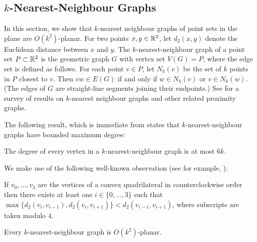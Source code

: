 \documentclass{patmorin}
\begin{document}
\subsection{$k$-Nearest-Neighbour Graphs}

In this section, we show that $k$-nearest neighbour graphs of point sets in the plane are $O(k^2)$-planar.  For two points $x,y\in\mathbb{R}^2$, let $d_2(x,y)$ denote the Euclidean distance between $x$ and $y$. The $k$-nearest-neighbour graph of a point set $P\subset\mathbb{R}^2$ is the geometric graph $G$ with vertex set $V(G)=P$, where the edge set is defined as follows. For each point $v\in P$, let $N_k(v)$ be the set of $k$ points in $P$ closest to $v$. Then $vw\in E(G)$ if and only if $w\in N_k(v)$ or $v\in N_k(w)$. (The edges of $G$ are straight-line segments joining their endpoints.) See \citep{ProximityGraphs} for a survey of results on $k$-nearest neighbour graphs and other related proximity graphs.

The following result, which is immediate from \citet[Corollary~4.2.6]{abrego.munroy.ea:on} states that $k$-nearest-neighbour graphs have bounded maximum degree:
\begin{lem}
\label{k-nn-max-degree}
The degree of every vertex in a $k$-nearest-neighbour graph is at most $6k$.
\end{lem}

We make use of the following well-known observation (see for example, \citet[Lemma~2]{bose.morin.ea:routing}):
\begin{obs}
\label{convex}
If $v_0,\ldots,v_3$ are the vertices of a convex quadrilateral in counterclockwise order then there exists at least one $i\in\{0,\ldots,3\}$ such that $\max\{d_2(v_i,v_{i-1}), d_2(v_i,v_{i+1})\} < d_2(v_{i-1},v_{i+1})$, where subscripts are taken modulo 4.
\end{obs}

\begin{lem}
\label{nearest-neighbour}
  Every $k$-nearest-neighbour graph is $O(k^2)$-planar.
\end{lem}
\end{document}
